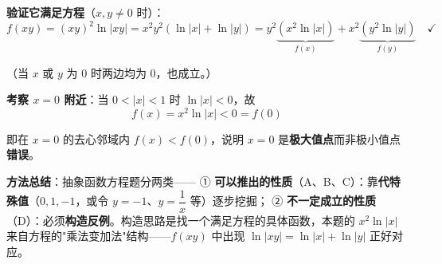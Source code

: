 \begin{answer}
\textbf{验证它满足方程}（$x,y\ne0$ 时）：
\nopagebreak[4]
\[f(xy)=(xy)^{2}\ln|xy|=x^{2}y^{2}\left(\ln|x|+\ln|y|\right)=y^{2}\underbrace{\left(x^{2}\ln|x|\right)}_{f(x)}+x^{2}\underbrace{\left(y^{2}\ln|y|\right)}_{f(y)}\quad\checkmark\]

（当 $x$ 或 $y$ 为 $0$ 时两边均为 $0$，也成立。）

\textbf{考察 $x=0$ 附近}：当 $0<|x|<1$ 时 $\ln|x|<0$，故
\nopagebreak[4]
\[f(x)=x^{2}\ln|x|<0=f(0)\]

即在 $x=0$ 的去心邻域内 $f(x)<f(0)$，说明 $x=0$ 是\textbf{极大值点}而非极小值点  \textbf{错误}。

\begin{gktip}
\textbf{方法总结}：抽象函数方程题分两类——
① \textbf{可以推出的性质}（A、B、C）：靠\textbf{代特殊值}（$0,1,-1$，或令 $y=-1$、$y=\dfrac1x$ 等）逐步挖掘；
② \textbf{不一定成立的性质}（D）：必须\textbf{构造反例}。构造思路是找一个满足方程的具体函数，本题的 $x^2\ln|x|$ 来自方程的"乘法变加法"结构——$f(xy)$ 中出现 $\ln|xy|=\ln|x|+\ln|y|$ 正好对应。
\end{gktip}


\par\medskip

\end{answer}
